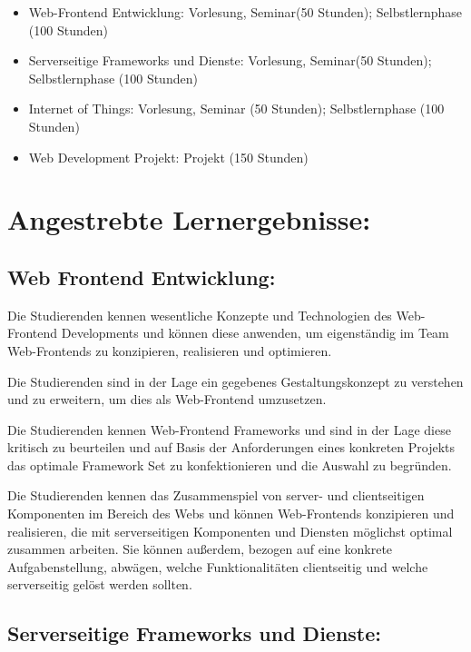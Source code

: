 \begin{itemize}
\tightlist
\item
  Web-Frontend Entwicklung: Vorlesung, Seminar(50 Stunden);
  Selbstlernphase (100 Stunden)
\item
  Serverseitige Frameworks und Dienste: Vorlesung, Seminar(50 Stunden);
  Selbstlernphase (100 Stunden)
\item
  Internet of Things: Vorlesung, Seminar (50 Stunden); Selbstlernphase
  (100 Stunden)
\item
  Web Development Projekt: Projekt (150 Stunden)
\end{itemize}

\section*{Angestrebte
Lernergebnisse:}\label{angestrebte-lernergebnisse-26}

\subsection*{Web Frontend
Entwicklung:}\label{web-frontend-entwicklung}

Die Studierenden kennen wesentliche Konzepte und Technologien des
Web-Frontend Developments und können diese anwenden, um eigenständig im
Team Web-Frontends zu konzipieren, realisieren und optimieren.

Die Studierenden sind in der Lage ein gegebenes Gestaltungskonzept zu
verstehen und zu erweitern, um dies als Web-Frontend umzusetzen.

Die Studierenden kennen Web-Frontend Frameworks und sind in der Lage
diese kritisch zu beurteilen und auf Basis der Anforderungen eines
konkreten Projekts das optimale Framework Set zu konfektionieren und die
Auswahl zu begründen.

Die Studierenden kennen das Zusammenspiel von server- und clientseitigen
Komponenten im Bereich des Webs und können Web-Frontends konzipieren und
realisieren, die mit serverseitigen Komponenten und Diensten möglichst
optimal zusammen arbeiten. Sie können außerdem, bezogen auf eine
konkrete Aufgabenstellung, abwägen, welche Funktionalitäten clientseitig
und welche serverseitig gelöst werden sollten.

\subsection*{Serverseitige Frameworks und
Dienste:}\label{serverseitige-frameworks-und-dienste}

